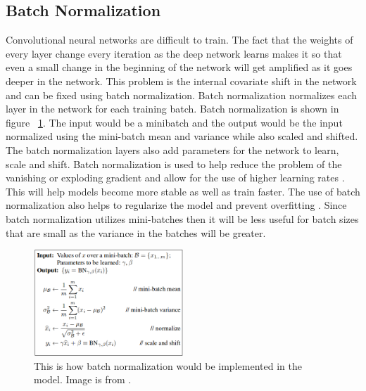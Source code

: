 \subsection{Batch Normalization}
    Convolutional neural networks are difficult to train. 
    The fact that the weights of every layer change every iteration as the deep network learns makes it so that even a small change in the beginning of the network will get amplified as it goes deeper in the network.
    This problem is the internal covariate shift in the network and can be fixed using batch normalization. 
    Batch normalization normalizes each layer in the network for each training batch. 
    Batch normalization is shown in figure ~\ref{fig_batch_norm}. 
    The input would be a minibatch and the output would be the input normalized using the mini-batch mean and variance while also scaled and shifted. 
    The batch normalization layers also add parameters for the network to learn, scale and shift.
    Batch normalization is used to help reduce the problem of the vanishing or exploding gradient and allow for the use of higher learning rates \cite{DBLP:journals/corr/IoffeS15}. 
    This will help models become more stable as well as train faster. 
    The use of batch normalization also helps to regularize the model and prevent overfitting \cite{DBLP:journals/corr/IoffeS15}. 
    Since batch normalization utilizes mini-batches then it will be less useful for batch sizes that are small as the variance in the batches will be greater.

\begin{figure}[tbh]
\centering
\includegraphics[width=0.5\textwidth]{batch_norm.png}
\caption{ This is how batch normalization would be implemented in the model. Image is from \cite{DBLP:journals/corr/IoffeS15}. }
\label{fig_batch_norm}
\end{figure} 





